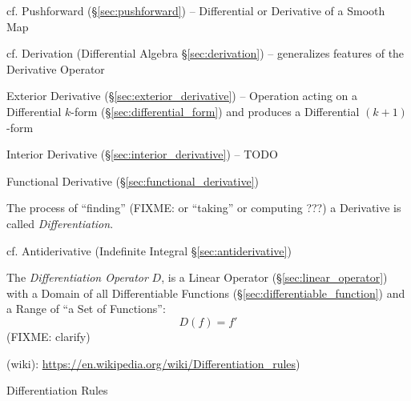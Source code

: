 \asterism

\fist cf. Pushforward (\S\ref{sec:pushforward}) -- Differential or Derivative of
a Smooth Map

\fist cf. Derivation (Differential Algebra \S\ref{sec:derivation}) --
generalizes features of the Derivative Operator

\fist Exterior Derivative (\S\ref{sec:exterior_derivative}) -- Operation acting
on a Differential $k$-form (\S\ref{sec:differential_form}) and produces a
Differential $(k+1)$-form

\fist Interior Derivative (\S\ref{sec:interior_derivative}) -- TODO

\fist Functional Derivative (\S\ref{sec:functional_derivative})

The process of ``finding'' (FIXME: or ``taking'' or computing ???) a Derivative
is called \emph{Differentiation}.

\fist cf. Antiderivative (Indefinite Integral \S\ref{sec:antiderivative})

The \emph{Differentiation Operator} $D$, is a Linear Operator
(\S\ref{sec:linear_operator}) with a Domain of all Differentiable Functions
(\S\ref{sec:differentiable_function}) and a Range of ``a Set of Functions'':
\[
  D(f) = f'
\]
(FIXME: clarify)

(wiki): \url{https://en.wikipedia.org/wiki/Differentiation_rules})

Differentiation Rules

